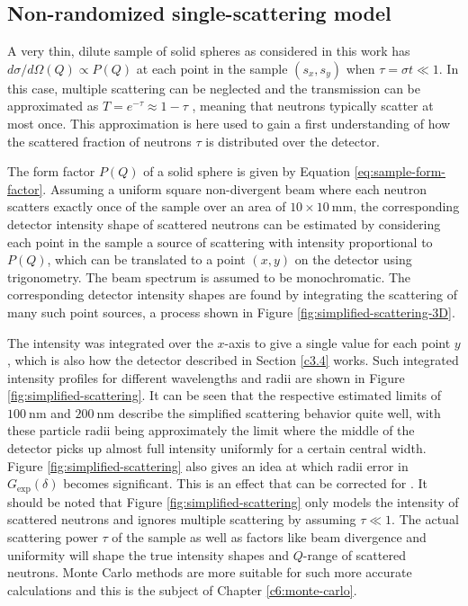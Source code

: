\subsection{Non-randomized single-scattering model}
A very thin, dilute sample of solid spheres as considered in this work has $d\sigma/d\Omega(Q) \propto P(Q)$ at each point in the sample $(s_x, s_y)$ when $\tau = \sigma t\ll 1$. In this case, multiple scattering can be neglected and the transmission can be approximated as $T = e^{-\tau} \approx 1 - \tau$  \cite{rekveldt2003}, meaning that neutrons typically scatter at most once. This approximation is here used to gain a first understanding of how the scattered fraction of neutrons $\tau$ is distributed over the detector.

The form factor $P(Q)$ of a solid sphere is given by Equation \eqref{eq:sample-form-factor}. Assuming a uniform square non-divergent beam where each neutron scatters exactly once of the sample over an area of $10\times10~\unit{\milli\meter}$, the corresponding detector intensity shape of scattered neutrons can be estimated by considering each point in the sample a source of scattering with intensity proportional to $P(Q)$, which can be translated to a point $(x,y)$ on the detector using trigonometry. The beam spectrum is assumed to be monochromatic. The corresponding detector intensity shapes are found by integrating the scattering of many such point sources, a process shown in Figure \ref{fig:simplified-scattering-3D}. 

The intensity was integrated over the $x$-axis to give a single value for each point $y$, which is also how the detector described in Section \ref{c3.4} works. Such integrated intensity profiles for different wavelengths and radii are shown in Figure \ref{fig:simplified-scattering}. It can be seen that the respective estimated limits of $\SI{100}{\nano\meter}$ and $\SI{200}{\nano\meter}$ describe the simplified scattering behavior quite well, with these particle radii being approximately the limit where the middle of the detector picks up almost full intensity uniformly for a certain central width. Figure \ref{fig:simplified-scattering} also gives an idea at which radii error in $G_\text{exp}(\delta)$ becomes significant. This is an effect that can be corrected for \cite{kusmin2017}. It should be noted that Figure \ref{fig:simplified-scattering} only models the intensity of scattered neutrons and ignores multiple scattering by assuming $\tau \ll 1$. The actual scattering power $\tau$ of the sample as well as factors like beam divergence and uniformity will shape the true intensity shapes and $Q$-range of scattered neutrons.  Monte Carlo methods are more suitable for such more accurate calculations and this is the subject of Chapter \ref{c6:monte-carlo}.

